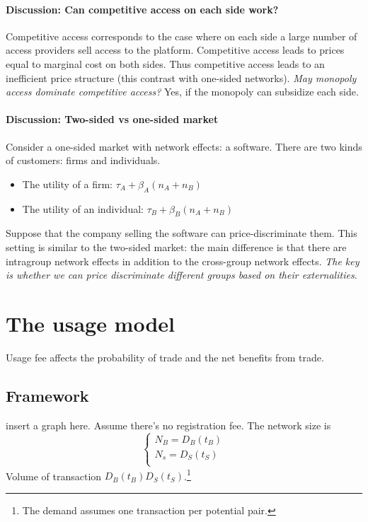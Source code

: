 \paragraph{Discussion: Can competitive access on each side work?} Competitive access corresponds to the case where on each side a large number of access providers sell access to the platform. Competitive access leads to prices equal to marginal cost on both sides. Thus competitive access leads to an inefficient price
structure (this contrast with one-sided networks). 
\textit{May monopoly access dominate competitive access?} Yes, if the monopoly can subsidize each side.
\paragraph{Discussion: Two-sided vs one-sided market} Consider a one-sided market with network effects: a software. There are two kinds of customers: firms and individuals. 
\begin{itemize}
    \item The utility of a firm: $\tau_A+\beta_A(n_A+n_B)$
    \item The utility of an individual: $\tau_B+\beta_B(n_A+n_B)$
\end{itemize}
Suppose that the company selling the software can
price-discriminate them. This setting is similar to the two-sided market: the main difference is that there are intragroup network effects in addition to the cross-group network effects. \textit{The key is whether we can price discriminate different groups based on their externalities.}
\section{The usage model}
Usage fee affects the probability of trade and the net benefits from trade.
\subsection{Framework}
insert a graph here. 
Assume there's no registration fee. The network size is \begin{equation*}
    \begin{cases}
        N_B=D_B(t_B)\\
        N_s=D_S(t_S)\\
    \end{cases}
\end{equation*}
Volume of transaction $D_B(t_B)D_S(t_S)$.\footnote{The demand assumes one transaction per potential pair.}
